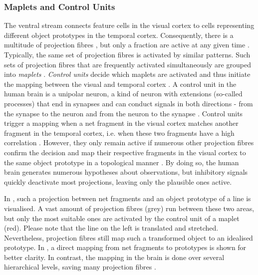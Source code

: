 \subsubsection{Maplets and Control Units}
The ventral stream  connects feature cells in the visual cortex to cells representing different object prototypes in the temporal cortex.  
Consequently, there is a multitude of projection fibres , but only a fraction are active at any given time .
Typically, the same set of projection fibres is activated by similar patterns.
Such sets of projection fibres that are frequently activated simultaneously are grouped into \emph{maplets} .
\emph{Control units} decide which maplets are activated and thus initiate the mapping between the visual and temporal cortex \cite{zhu_maplets_2004}. 
A control unit in the human brain is a unipolar neuron, a kind of neuron with extensions (so-called processes) that end in synapses and can conduct signals in both directions - from the synapse to the neuron and from the neuron to the synapse .
Control units trigger a mapping when a net fragment in the visual cortex matches another fragment in the temporal cortex, i.e. when these two fragments have a high correlation \cite{zhu_maplets_2004}. However, they only remain active if numerous other projection fibres confirm the decision and map their respective fragments in the visual cortex to the same object prototype in a topological manner . By doing so, the human brain generates numerous hypotheses about observations, but inhibitory signals quickly deactivate most projections, leaving only the plausible ones active.

In , such a projection between net fragments and an object prototype of a line is visualised. A vast amount of projection fibres (grey) run between these two areas, but only the most suitable ones are activated by the control unit of a maplet (red).
Please note that the line on the left is translated and stretched. Nevertheless, projection fibres still map such a transformed object to an idealised prototype.
In , a direct mapping from net fragments to prototypes is shown for better clarity. In contrast, the mapping in the brain is done over several hierarchical levels, saving many projection fibres .

